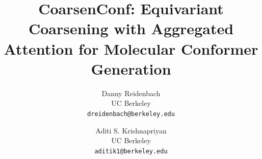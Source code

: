 \documentclass{article}
\title{\textbf{CoarsenConf: Equivariant Coarsening with Aggregated Attention for Molecular Conformer Generation}
}
\author{%
  Danny Reidenbach \\ 
  UC Berkeley \\
  \texttt{dreidenbach@berkeley.edu} 
  \and Aditi S. Krishnapriyan \\
  UC Berkeley \\
  \texttt{aditik1@berkeley.edu}
}
\begin{document}
\date{}
\maketitle












\newpage
\appendix

\end{document}
